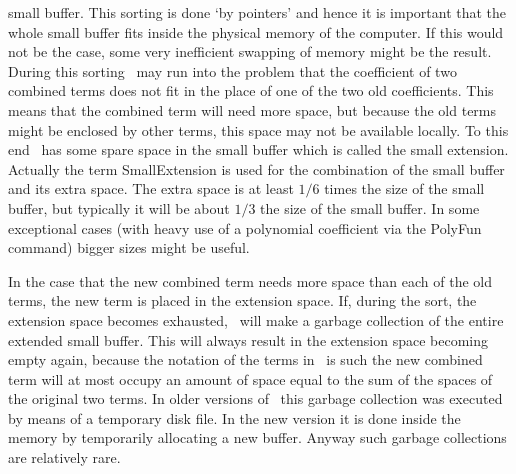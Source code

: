 small buffer. This sorting is done 
`by pointers' and hence it is important that the whole small buffer fits 
inside the physical memory of the computer. If this would not be the case, 
some very inefficient swapping of memory might be the result. During this 
sorting \FORM\ may run into the problem that the coefficient of two combined 
terms does not fit in the place of one of the two old coefficients. This 
means that the combined term will need more space, but because the old 
terms might be enclosed by other terms, this space may not be available 
locally. To this end \FORM\ has some spare space in the small buffer which is 
called the small extension. 
Actually the term SmallExtension is used for the 
combination of the small buffer and its extra space. The extra space is at 
least $1/6$ times the size of the small buffer, but typically it will be 
about $1/3$ the size of the small buffer. In some exceptional cases (with 
heavy use of a polynomial coefficient via the PolyFun 
command) bigger sizes might be useful.

In the case that the new combined term needs more space than each of the 
old terms, the new term is placed in the extension space. If, during the 
sort, the extension space becomes exhausted, \FORM\ will make a 
garbage 
collection of the entire extended small buffer. This will always result in 
the extension space becoming empty again, because the notation of the terms 
in \FORM\ is such the new combined term will at most occupy an amount 
of space equal to the sum of the spaces of the original two terms. In older 
versions of \FORM\ this garbage collection was executed by means of a 
temporary disk file. In the new version it is done inside the memory by 
temporarily allocating a new buffer. Anyway such garbage collections are 
relatively rare.

